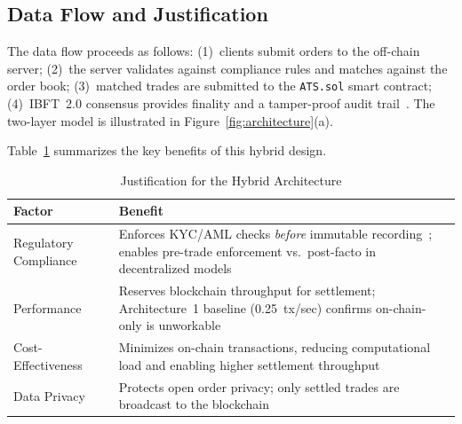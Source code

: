 \subsection{Data Flow and Justification}

The data flow proceeds as follows: (1)~clients submit orders to the off-chain server; (2)~the server validates against compliance rules and matches against the order book; (3)~matched trades are submitted to the \texttt{ATS.sol} smart contract; (4)~IBFT~2.0 consensus provides finality and a tamper-proof audit trail~\cite{kuhn2019rethinking}. The two-layer model is illustrated in Figure~\ref{fig:architecture}(a).

Table~\ref{tab:architecture-justification} summarizes the key benefits of this hybrid design.

\begin{table}[htbp]
\centering
\caption{Justification for the Hybrid Architecture}
\label{tab:architecture-justification}
\begin{tabular}{@{}p{}p{}@{}}
\toprule
\textbf{Factor} & \textbf{Benefit} \\
\midrule
Regulatory Compliance & Enforces KYC/AML checks \textit{before} immutable recording~\cite{fincen2024kyc}; enables pre-trade enforcement vs.\ post-facto in decentralized models \\
\addlinespace
Performance & Reserves blockchain throughput for settlement; Architecture~1 baseline (0.25~tx/sec) confirms on-chain-only is unworkable~\cite{khan2021blockchain} \\
\addlinespace
Cost-Effectiveness & Minimizes on-chain transactions, reducing computational load and enabling higher settlement throughput \\
\addlinespace
Data Privacy & Protects open order privacy; only settled trades are broadcast to the blockchain \\
\bottomrule
\end{tabular}
\end{table}
